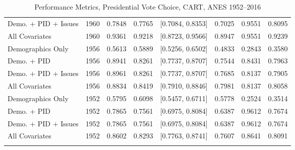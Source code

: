 \begin{longtable}{lrrrlrrr}
  Demo. + PID + Issues & 1960 & 0.7848 & 0.7765 & [0.7084, 0.8353] & 0.7025 & 0.9551 & 0.8095 \\ 
  All Covariates & 1960 & 0.9361 & 0.9218 & [0.8723, 0.9566] & 0.8947 & 0.9551 & 0.9239 \\ 
  Demographics Only & 1956 & 0.5613 & 0.5889 & [0.5256, 0.6502] & 0.4833 & 0.2843 & 0.3580 \\ 
  Demo. + PID & 1956 & 0.8941 & 0.8261 & [0.7737, 0.8707] & 0.7544 & 0.8431 & 0.7963 \\ 
  Demo. + PID + Issues & 1956 & 0.8961 & 0.8261 & [0.7737, 0.8707] & 0.7685 & 0.8137 & 0.7905 \\ 
  All Covariates & 1956 & 0.8834 & 0.8419 & [0.7910, 0.8846] & 0.7981 & 0.8137 & 0.8058 \\ 
  Demographics Only & 1952 & 0.5795 & 0.6098 & [0.5457, 0.6711] & 0.5778 & 0.2524 & 0.3514 \\ 
  Demo. + PID & 1952 & 0.7865 & 0.7561 & [0.6975, 0.8084] & 0.6387 & 0.9612 & 0.7674 \\ 
  Demo. + PID + Issues & 1952 & 0.7865 & 0.7561 & [0.6975, 0.8084] & 0.6387 & 0.9612 & 0.7674 \\ 
  All Covariates & 1952 & 0.8602 & 0.8293 & [0.7763, 0.8741] & 0.7607 & 0.8641 & 0.8091 \\ 
   \bottomrule
\caption{Performance Metrics, Presidential Vote Choice, CART, ANES 1952--2016} 
\label{tab:ANES_prezvote_cart}
\end{longtable}
